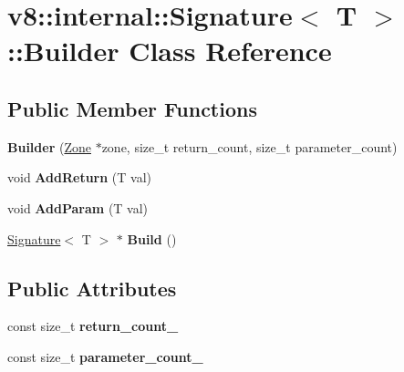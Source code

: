 \hypertarget{classv8_1_1internal_1_1_signature_1_1_builder}{}\section{v8\+:\+:internal\+:\+:Signature$<$ T $>$\+:\+:Builder Class Reference}
\label{classv8_1_1internal_1_1_signature_1_1_builder}
\subsection*{Public Member Functions}
\begin{DoxyCompactItemize}
\item 
{\bfseries Builder} (\hyperlink{classv8_1_1internal_1_1_zone}{Zone} $\ast$zone, size\+\_\+t return\+\_\+count, size\+\_\+t parameter\+\_\+count)\hypertarget{classv8_1_1internal_1_1_signature_1_1_builder_ade96a4413bb2a2ddf53ac28245fda492}{}\label{classv8_1_1internal_1_1_signature_1_1_builder_ade96a4413bb2a2ddf53ac28245fda492}

\item 
void {\bfseries Add\+Return} (T val)\hypertarget{classv8_1_1internal_1_1_signature_1_1_builder_ad1096e6ebaad8fd6c7d497fa014f02c6}{}\label{classv8_1_1internal_1_1_signature_1_1_builder_ad1096e6ebaad8fd6c7d497fa014f02c6}

\item 
void {\bfseries Add\+Param} (T val)\hypertarget{classv8_1_1internal_1_1_signature_1_1_builder_a00f65920a72a4b06fd3ac99be2a40fac}{}\label{classv8_1_1internal_1_1_signature_1_1_builder_a00f65920a72a4b06fd3ac99be2a40fac}

\item 
\hyperlink{classv8_1_1internal_1_1_signature}{Signature}$<$ T $>$ $\ast$ {\bfseries Build} ()\hypertarget{classv8_1_1internal_1_1_signature_1_1_builder_acb0ca8899529ab943d71625f920d406c}{}\label{classv8_1_1internal_1_1_signature_1_1_builder_acb0ca8899529ab943d71625f920d406c}

\end{DoxyCompactItemize}
\subsection*{Public Attributes}
\begin{DoxyCompactItemize}
\item 
const size\+\_\+t {\bfseries return\+\_\+count\+\_\+}\hypertarget{classv8_1_1internal_1_1_signature_1_1_builder_a009b50f011533c5ec1b96b1b7d967cb2}{}\label{classv8_1_1internal_1_1_signature_1_1_builder_a009b50f011533c5ec1b96b1b7d967cb2}

\item 
const size\+\_\+t {\bfseries parameter\+\_\+count\+\_\+}\hypertarget{classv8_1_1internal_1_1_signature_1_1_builder_a64e60fc499775603873cb2c3ee5ba501}{}\label{classv8_1_1internal_1_1_signature_1_1_builder_a64e60fc499775603873cb2c3ee5ba501}

\end{DoxyCompactItemize}
